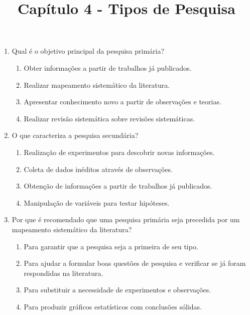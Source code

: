 \documentclass[a4paper,12pt]{article}
\title{Capítulo 4 - Tipos de Pesquisa}
\author{}
\date{}
\begin{document}
\maketitle

\vspace{-2cm}

\footnotesize

\begin{enumerate}

    \item Qual é o objetivo principal da pesquisa primária?
    \begin{enumerate}[label=(\alph*)]
        \item Obter informações a partir de trabalhos já publicados.
        \item Realizar mapeamento sistemático da literatura.
        \item Apresentar conhecimento novo a partir de observações e teorias.
        \item Realizar revisão sistemática sobre revisões sistemáticas.
    \end{enumerate}

\item O que caracteriza a pesquisa secundária?
    \begin{enumerate}[label=(\alph*)]
        \item Realização de experimentos para descobrir novas informações.
        \item Coleta de dados inéditos através de observações.
        \item Obtenção de informações a partir de trabalhos já publicados.
        \item Manipulação de variáveis para testar hipóteses.
    \end{enumerate}

\item Por que é recomendado que uma pesquisa primária seja precedida por um mapeamento sistemático da literatura?
    \begin{enumerate}[label=(\alph*)]
        \item Para garantir que a pesquisa seja a primeira de seu tipo.
        \item Para ajudar a formular boas questões de pesquisa e verificar se já foram respondidas na literatura.
        \item Para substituir a necessidade de experimentos e observações.
        \item Para produzir gráficos estatísticos com conclusões sólidas.
    \end{enumerate}


\end{enumerate}
\end{document}
